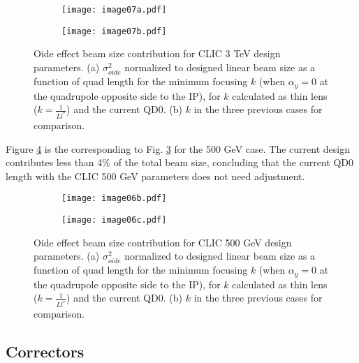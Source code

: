 \begin{figure}[!htb]
\centering
\hspace*{-0.6cm}
\begin{subfigure}{0.45\textwidth}
\centering
\texttt{[image: image07a.pdf]}\caption{}\label{fig-3TeV:a}
\end{subfigure}
\begin{subfigure}{0.45\textwidth}
\centering
\texttt{[image: image07b.pdf]}\caption{}\label{fig-3TeV:b}
\end{subfigure}
\caption{Oide effect beam size contribution for CLIC 3 TeV design parameters. (a) $\sigma^2_{oide}$ normalized to designed linear beam size as a function of quad length for the minimum focusing $k$ (when $\alpha_y=0$ at the quadrupole opposite side to the IP), for $k$ calculated as thin lens ($k=\frac{1}{Ll^*}$) and the current QD0. (b) $k$ in the three previous cases for comparison.}\label{fig-3TeV}	
 \end{figure}\par
Figure \ref{fig-500GeV} is the corresponding to Fig. \ref{fig-3TeV} for the 500 GeV case. The current design contributes less than 4\% of the total beam size, concluding that the current QD0 length with the CLIC 500 GeV parameters does not need adjustment.\par
\begin{figure}[!htb]
\centering
\hspace*{-0.6cm}
\begin{subfigure}{0.45\textwidth}
\centering
\texttt{[image: image06b.pdf]}\caption{}
\end{subfigure}
\begin{subfigure}{0.45\textwidth}
\centering
\texttt{[image: image06c.pdf]}\caption{}
\end{subfigure}
\caption{Oide effect beam size contribution for CLIC 500 GeV design parameters. (a) $\sigma^2_{oide}$ normalized to designed linear beam size as a function of quad length for the minimum focusing $k$ (when $\alpha_y=0$ at the quadrupole opposite side to the IP), for $k$ calculated as thin lens ($k=\frac{1}{Ll^*}$) and the current QD0. (b) $k$ in the three previous cases for comparison.}\label{fig-500GeV}
 \end{figure}\par	

\subsection{Correctors}
